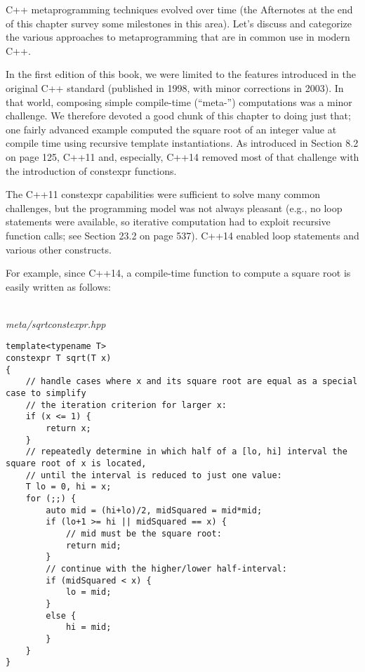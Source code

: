 
C++ metaprogramming techniques evolved over time (the Afternotes at the end of this chapter survey some milestones in this area). Let’s discuss and categorize the various approaches to metaprogramming that are in common use in modern C++.


In the first edition of this book, we were limited to the features introduced in the original C++ standard (published in 1998, with minor corrections in 2003). In that world, composing simple compile-time (“meta-”) computations was a minor challenge. We therefore devoted a good chunk of this chapter to doing just that; one fairly advanced example computed the square root of an integer value at compile time using recursive template instantiations. As introduced in Section 8.2 on page 125, C++11 and, especially, C++14 removed most of that challenge with the introduction of constexpr functions.

\begin{tcolorbox}[colback=webgreen!5!white,colframe=webgreen!75!black]
\hspace*{0.75cm}The C++11 constexpr capabilities were sufficient to solve many common challenges, but the programming model was not always pleasant (e.g., no loop statements were available, so iterative computation had to exploit recursive function calls; see Section 23.2 on page 537). C++14 enabled loop statements and various other constructs.
\end{tcolorbox}

For example, since C++14, a compile-time function to compute a square root is easily written as follows:

\hspace*{\fill} \\ %
\noindent
\textit{meta/sqrtconstexpr.hpp}
\begin{lstlisting}[style=styleCXX]
template<typename T>
constexpr T sqrt(T x)
{
	// handle cases where x and its square root are equal as a special case to simplify
	// the iteration criterion for larger x:
	if (x <= 1) {
		return x;
	}
	// repeatedly determine in which half of a [lo, hi] interval the square root of x is located,
	// until the interval is reduced to just one value:
	T lo = 0, hi = x;
	for (;;) {
		auto mid = (hi+lo)/2, midSquared = mid*mid;
		if (lo+1 >= hi || midSquared == x) {
			// mid must be the square root:
			return mid;
		}
		// continue with the higher/lower half-interval:
		if (midSquared < x) {
			lo = mid;
		}
		else {
			hi = mid;
		}
	}
}
\end{lstlisting}

